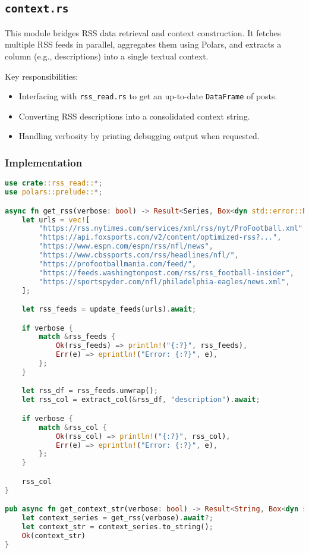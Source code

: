 \subsection{\lstinline{context.rs}}
This module bridges RSS data retrieval and context construction. It fetches multiple RSS feeds in parallel, aggregates them using Polars, and extracts a column (e.g., descriptions) into a single textual context.

Key responsibilities:
\begin{itemize}
    \item Interfacing with \lstinline{rss_read.rs} to get an up-to-date \lstinline{DataFrame} of posts.
    \item Converting RSS descriptions into a consolidated context string.
    \item Handling verbosity by printing debugging output when requested.
\end{itemize}

\subsubsection{Implementation}
\begin{lstlisting}[language=rust]
use crate::rss_read::*;
use polars::prelude::*;

async fn get_rss(verbose: bool) -> Result<Series, Box<dyn std::error::Error>> {
    let urls = vec![
        "https://rss.nytimes.com/services/xml/rss/nyt/ProFootball.xml",
        "https://api.foxsports.com/v2/content/optimized-rss?...",
        "https://www.espn.com/espn/rss/nfl/news",
        "https://www.cbssports.com/rss/headlines/nfl/",
        "https://profootballmania.com/feed/",
        "https://feeds.washingtonpost.com/rss/rss_football-insider",
        "https://sportspyder.com/nfl/philadelphia-eagles/news.xml",
    ];

    let rss_feeds = update_feeds(urls).await;

    if verbose {
        match &rss_feeds {
            Ok(rss_feeds) => println!("{:?}", rss_feeds),
            Err(e) => eprintln!("Error: {:?}", e),
        };
    }

    let rss_df = rss_feeds.unwrap();
    let rss_col = extract_col(&rss_df, "description").await;

    if verbose {
        match &rss_col {
            Ok(rss_col) => println!("{:?}", rss_col),
            Err(e) => eprintln!("Error: {:?}", e),
        };
    }

    rss_col
}

pub async fn get_context_str(verbose: bool) -> Result<String, Box<dyn std::error::Error>> {
    let context_series = get_rss(verbose).await?;
    let context_str = context_series.to_string();
    Ok(context_str)
}
\end{lstlisting}


